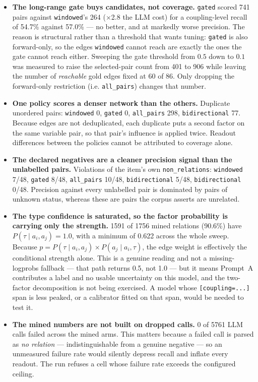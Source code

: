 \documentclass[11pt]{article}
\begin{document}
\begin{itemize}
\item \textbf{The long-range gate buys candidates, not coverage.} \texttt{gated} scored 741 pairs against \texttt{windowed}'s 264 ($\times$2.8 the LLM cost) for a coupling-level recall of 54.7\% against 57.0\% --- no better, and at markedly worse precision. The reason is structural rather than a threshold that wants tuning: \texttt{gated} is also forward-only, so the edges \texttt{windowed} cannot reach are exactly the ones the gate cannot reach either. Sweeping the gate threshold from $0.5$ down to $0.1$ was measured to raise the selected-pair count from 401 to 906 while leaving the number of \emph{reachable} gold edges fixed at 60 of 86. Only dropping the forward-only restriction (i.e. \texttt{all\_pairs}) changes that number.
\item \textbf{One policy scores a denser network than the others.} Duplicate unordered pairs: \texttt{windowed} 0, \texttt{gated} 0, \texttt{all\_pairs} 298, \texttt{bidirectional} 77. Because edges are not deduplicated, each duplicate puts a second factor on the same variable pair, so that pair's influence is applied twice. Readout differences between the policies cannot be attributed to coverage alone.
\item \textbf{The declared negatives are a cleaner precision signal than the unlabelled pairs.} Violations of the item's own \texttt{non\_relations}: \texttt{windowed} 7/48, \texttt{gated} 8/48, \texttt{all\_pairs} 10/48, \texttt{bidirectional} 5/48, \texttt{bidirectional} 0/48. Precision against every unlabelled pair is dominated by pairs of unknown status, whereas these are pairs the corpus asserts are unrelated.
\item \textbf{The type confidence is saturated, so the factor probability is carrying only the strength.} 1591 of 1756 mined relations (90.6\%) have $P(\tau \mid a_i,a_j) = 1.0$, with a minimum of 0.622 across the whole sweep. Because $p = P(\tau \mid a_i,a_j) \times P(a_j \mid a_i,\tau)$, the edge weight is effectively the conditional strength alone. This is a genuine reading and not a missing-logprobs fallback --- that path returns 0.5, not 1.0 --- but it means Prompt~A contributes a label and no usable uncertainty on this model, and the two-factor decomposition is not being exercised. A model whose \texttt{[coupling=...]} span is less peaked, or a calibrator fitted on that span, would be needed to test it.
\item \textbf{The mined numbers are not built on dropped calls.} 0 of 5761 LLM calls failed across the mined arms. This matters because a failed call is parsed as \emph{no relation} --- indistinguishable from a genuine negative --- so an unmeasured failure rate would silently depress recall and inflate every readout. The run refuses a cell whose failure rate exceeds the configured ceiling.
\end{itemize}
\end{document}
